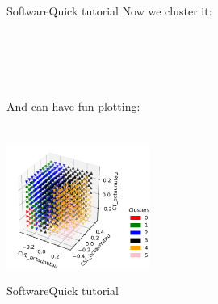 \begin{frame}{Software}{Quick tutorial}
	Now we cluster it: \\[2ex]
	
	{
		\noindent
		\ttfamily\small
		\hlopt{=\ }\hlstd{}\hlstd{}\hlopt{(}\hlstd{}\hlstd{}\hlopt{,\ }\hlstd{}\hlstd{}\hlopt{)}\hspace*{\fill}\\
		\hlstd{}\hlstd{}\hlopt{()}\hspace*{\fill}\\
		\hlstd{}\hlstd{}\hlopt{(}\hlopt{=}\hlstd{}\hlstd{}\hlopt{)}\hspace*{\fill}\\
		\hlstd{}\hspace*{\fill}\\
		\hspace*{\fill}
		\normalfont
		\normalsize
	}\\
	And can have fun plotting: \\[1ex]
	{
		\noindent
		\ttfamily\small
	\hlopt{=\ }\hlstd{}\hlstd{}\hlopt{(}\hlopt{)}\hspace*{\fill}\\
	\hlstd{}\hlstd{}\hlopt{({[}}\hlstd{}\hlstd{}\hlopt{,\ }\hlstd{}\hlstd{}\hlopt{,\ }\hlstd{}\hlstd{}\hlopt{{]})}\hspace*{\fill}\\	
	}
	\includegraphics[height=4cm]{figures/plots/3d.pdf}
\end{frame}

\begin{frame}{Software}{Quick tutorial}
	
\end{frame}
